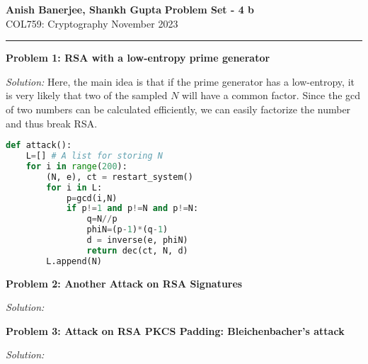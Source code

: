 \documentclass[a4paper, 11pt]{article}
\newcommand{\hr}{\noindent\rule{7in}{2.8pt}}
\newenvironment{solution}
    {\textit{Solution:}}
    {\clearpage}
\newcommand{\prob}[1]{\begin{mdframed}[backgroundcolor=gray!20] \textbf{Problem #1}\end{mdframed}}
\begin{document}
\noindent
\large\textbf{Anish Banerjee, Shankh Gupta} \hfill \textbf{Problem Set - 4 b}   \\
\normalsize COL759: Cryptography \hfill November 2023\\
\hr


\prob{1: RSA with a low-entropy prime generator}
\begin{solution}
    Here, the main idea is that if the prime generator has a low-entropy, it is very likely that two of the sampled $N$ will have a common factor. Since the gcd of two numbers can be calculated efficiently, we can easily factorize the number and thus break RSA.
    \begin{lstlisting}[language=Python, caption=RSA with a low-entropy prime generator]
def attack():
    L=[] # A list for storing N
    for i in range(200):
        (N, e), ct = restart_system()
        for i in L:
            p=gcd(i,N)
            if p!=1 and p!=N and p!=N:
                q=N//p
                phiN=(p-1)*(q-1)
                d = inverse(e, phiN)
                return dec(ct, N, d)
        L.append(N)
        \end{lstlisting}
\end{solution}

\prob{2: Another Attack on RSA Signatures}
\begin{solution}
    
\end{solution}

\prob{3: Attack on RSA PKCS Padding: Bleichenbacher's attack}
\begin{solution}
    
\end{solution}
\end{document}
